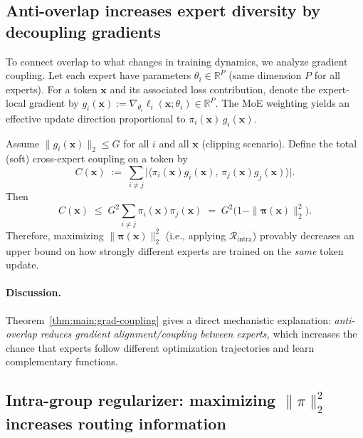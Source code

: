 \documentclass[sigconf,nonacm]{acmart}
\begin{document}
\subsection{Anti-overlap increases expert diversity by decoupling gradients}
\label{sec:main:theory-gradients}

To connect overlap to what changes in training dynamics, we analyze gradient coupling.
Let each expert have parameters $\theta_i\in\mathbb{R}^P$ (same dimension $P$ for all experts).
For a token $\mathbf{x}$ and its associated loss contribution, denote the expert-local gradient by
$g_i(\mathbf{x}) := \nabla_{\theta_i}\ell_i(\mathbf{x};\theta_i)\in\mathbb{R}^P$.
The MoE weighting yields an effective update direction proportional to
$\pi_i(\mathbf{x})\,g_i(\mathbf{x})$.

\begin{theorem}
\label{thm:main:grad-coupling}
Assume $\|g_i(\mathbf{x})\|_2 \le G$ for all $i$ and all $\mathbf{x}$ (clipping scenario).
Define the total (soft) cross-expert coupling on a token by
\[
C(\mathbf{x})
\;:=\;
\sum_{i\neq j}\bigl|\langle \pi_i(\mathbf{x})g_i(\mathbf{x}),\,\pi_j(\mathbf{x})g_j(\mathbf{x})\rangle\bigr|.
\]
Then
\[
C(\mathbf{x})
\;\le\;
G^2\sum_{i\neq j}\pi_i(\mathbf{x})\pi_j(\mathbf{x})
\;=\;
G^2\bigl(1-\|\bm{\pi}(\mathbf{x})\|_2^2\bigr).
\]
Therefore, maximizing $\|\bm{\pi}(\mathbf{x})\|_2^2$ (i.e., applying $\mathcal{R}_{\text{intra}}$)
provably decreases an upper bound on how strongly different experts are trained on the \emph{same} token update.
\end{theorem}

\begin{tcolorbox}[colback=gray!0,colframe=gray!30,arc=2mm]
\paragraph{Discussion.}
Theorem~\ref{thm:main:grad-coupling} gives a direct mechanistic explanation:
\emph{anti-overlap reduces gradient alignment/coupling between experts,}
which increases the chance that experts follow different optimization trajectories and learn complementary functions.
\end{tcolorbox}
\subsection{Intra-group regularizer: maximizing $\|\pi\|_2^2$ increases routing information}
\label{sec:main:theory-mi}
\end{document}
